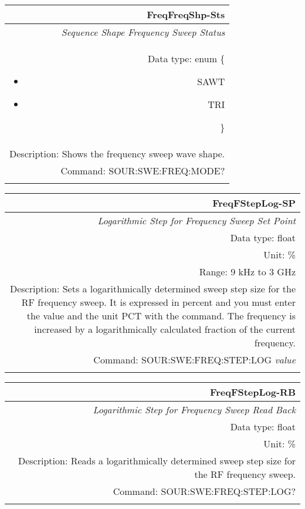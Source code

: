 \documentclass[openany]{article}
\begin{document}
		\begin{tabular}{N}
			\hline
			\bfseries FreqFreqShp-Sts \\ \hline
			\emph{Sequence Shape Frequency Sweep Status} \\
			Data type: enum \{\begin{itemize}[noitemsep]
				\small
				\item[] SAWT
				\item[] TRI
			\end{itemize}\} \\
			Description: Shows the frequency sweep wave shape. \\
			Command: SOUR:SWE:FREQ:MODE? \\
			\\

		\end{tabular}


		\begin{tabular}{N}
			\hline
			\bfseries FreqFStepLog-SP \\ \hline
			\emph{Logarithmic Step for Frequency Sweep Set Point} \\
			Data type: float \\
			Unit: \% \\
			Range: 9 kHz to 3 GHz \\
			Description: Sets a logarithmically determined sweep step size for the RF frequency sweep. It is expressed in percent and you must enter the value and the unit PCT with the command. The frequency is increased by a logarithmically calculated fraction of the current frequency. \\
			Command: SOUR:SWE:FREQ:STEP:LOG \emph{value} \\
			\\
			
		\end{tabular}


		\begin{tabular}{N}
			\hline
			\bfseries FreqFStepLog-RB \\ \hline
			\emph{Logarithmic Step for Frequency Sweep Read Back} \\
			Data type: float \\
			Unit: \% \\
			Description: Reads a logarithmically determined sweep step size for the RF frequency sweep. \\
			Command: SOUR:SWE:FREQ:STEP:LOG? \\
			\\

		\end{tabular}
\end{document}
